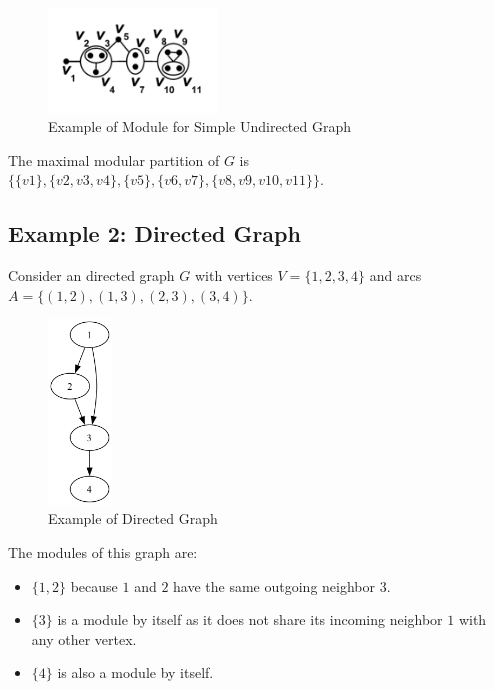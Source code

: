 \begin{figure}[!h]
    \centering
    \includegraphics[width=0.40\textwidth]{images/graphs/undirected_graph_wikipedia_module}
    \caption{Example of Module for Simple Undirected Graph}
    \label{fig:example-undirected-graph-module}
\end{figure}

The maximal modular partition of $G$ is $\{\{v1\}, \{v2, v3, v4\}, \{v5\}, \{v6, v7\}, \{v8, v9, v10, v11\}\}$.

\subsection*{Example 2: Directed Graph}\label{subsec:example-2:-directed-graph}

Consider an directed graph $G$ with vertices $V = \{1, 2, 3, 4\}$ and arcs $A = \{(1, 2), (1, 3), (2, 3), (3, 4)\}$.

\begin{figure}[!h]
    \centering
    \includegraphics[width=0.15\textwidth]{images/graphs/oriented_graph}
    \caption{Example of Directed Graph}
    \label{fig:example-2}
\end{figure}

The modules of this graph are:

\begin{itemize}
    \item $\{1, 2\}$ because $1$ and $2$ have the same outgoing neighbor $3$.
    \item $\{3\}$ is a module by itself as it does not share its incoming neighbor $1$ with any other vertex.
    \item $\{4\}$ is also a module by itself.
\end{itemize}

